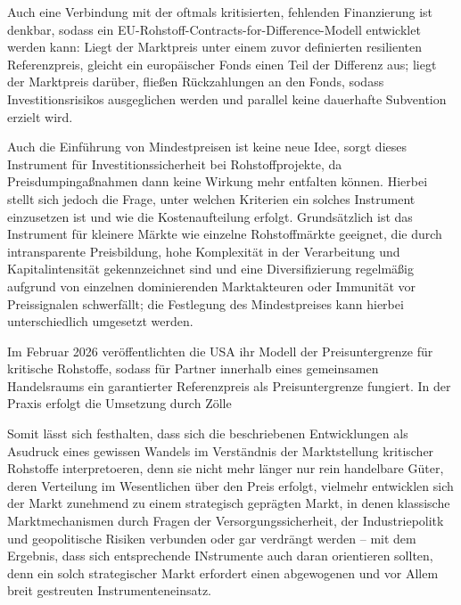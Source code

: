 \documentclass[12pt,a4paper,oneside]{book} %
\begin{document}
Auch eine Verbindung mit der oftmals kritisierten, fehlenden Finanzierung ist denkbar, sodass ein EU-Rohstoff-Contracts-for-Difference-Modell entwicklet werden kann: Liegt der Marktpreis unter einem zuvor definierten resilienten Referenzpreis, gleicht ein europäischer Fonds einen Teil der Differenz aus; liegt der Marktpreis darüber, fließen Rückzahlungen an den Fonds, sodass Investitionsrisikos ausgeglichen werden und parallel keine dauerhafte Subvention erzielt wird.

Auch die Einführung von Mindestpreisen ist keine neue Idee, sorgt dieses Instrument für Investitionssicherheit bei Rohstoffprojekte, da Preisdumpingaßnahmen dann keine Wirkung mehr entfalten können. Hierbei stellt sich jedoch die Frage, unter welchen Kriterien ein solches Instrument einzusetzen ist und wie die Kostenaufteilung erfolgt. Grundsätzlich ist das Instrument für kleinere Märkte wie einzelne Rohstoffmärkte geeignet, die durch intransparente Preisbildung, hohe Komplexität in der Verarbeitung und Kapitalintensität gekennzeichnet sind und eine Diversifizierung regelmäßig aufgrund von einzelnen dominierenden Marktakteuren oder Immunität vor Preissignalen schwerfällt; die Festlegung des Mindestpreises kann hierbei unterschiedlich umgesetzt werden.\autocite[Beispielsweise kann der Staat Rohstoffe selbst zum Mindestpreis aufkaufen, sollte der Marktpreis die Preisuntergrenze unterschreiten und dies mit einem STockpiling verbinden]{Financial Tools for Boosting Resilience of CRM Value Chains and Strategic Stockpiling, S. 17 }

Im Februar 2026 veröffentlichten die USA ihr Modell der Preisuntergrenze für kritische Rohstoffe, sodass für Partner innerhalb eines gemeinsamen Handelsraums ein garantierter Referenzpreis als Preisuntergrenze fungiert. In der Praxis erfolgt die Umsetzung durch Zölle

Somit lässt sich festhalten, dass sich die beschriebenen Entwicklungen als Asudruck eines gewissen Wandels im Verständnis der Marktstellung kritischer Rohstoffe interpretoeren, denn sie nicht mehr länger nur rein handelbare Güter, deren Verteilung im Wesentlichen über den Preis erfolgt, vielmehr entwicklen sich der Markt zunehmend zu einem strategisch geprägten Markt, in denen klassische Marktmechanismen durch Fragen der Versorgungssicherheit, der Industriepolitk und geopolitische Risiken verbunden oder gar verdrängt werden -- mit dem Ergebnis, dass sich entsprechende INstrumente auch daran orientieren sollten, denn ein solch strategischer Markt erfordert einen abgewogenen und vor Allem breit gestreuten Instrumenteneinsatz.
\end{document}
